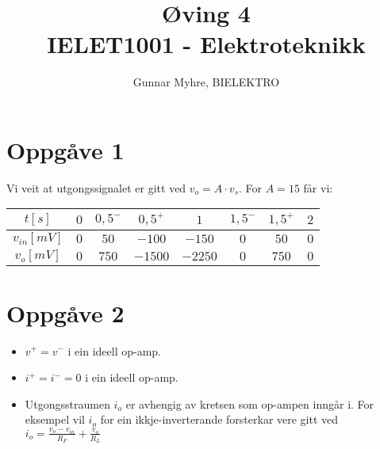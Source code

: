 \documentclass[12pt,a4paper]{article}
\title{%
  Øving 4 \\
  \large IELET1001 - Elektroteknikk \\
  }
\author{Gunnar Myhre, BIELEKTRO}
\begin{document}
  \maketitle
    
  \section{Oppgåve 1}
    Vi veit at utgongssignalet er gitt ved $v_o=A\cdot v_s$. For $A = 15$ får vi:
    \begin{center}
      \begin{tabular}{ |c|c|c|c|c|c|c|c| }
        \hline
        $t [s]$ & $0$ & $0,5^-$ & $0,5^+$ & $1$ & $1,5^-$ & $1,5^+$ & $2$ \\
        \hline
        $v_{in}[mV]$ & $0$ & $50$ & $-100$ & $-150$ & $0$ & $50$ & $0$ \\
        \hline
        $v_{o}[mV]$ & $0$ & $750$ & $-1500$ & $-2250$ & $0$ & $750$ & $0$ \\
        \hline
      \end{tabular}
    \end{center}

    \begin{center}
    \end{center}

  \section{Oppgåve 2}
    \begin{itemize}
      \item $v^+ = v^-$ i ein ideell op-amp.
      \item $i^+ = i^- = 0$ i ein ideell op-amp.
      \item Utgongsstraumen $i_o$ er avhengig av kretsen som op-ampen inngår i. For eksempel
        vil $i_o$ for ein ikkje-inverterande forsterkar vere gitt ved
        $i_o = \frac{v_o-v_{in}}{R_F}+\frac{v_o}{R_L}$
    \end{itemize}
\end{document}
